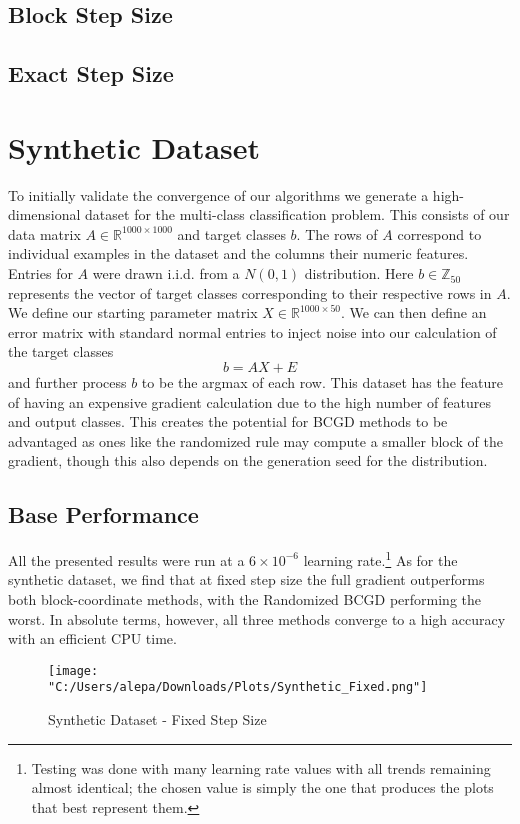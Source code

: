 \documentclass{article}
\begin{document}
\subsection{Block Step Size}
\subsection{Exact Step Size}

\section{Synthetic Dataset}
To initially validate the convergence of our algorithms we generate a high-dimensional dataset for the multi-class classification problem. This consists of our data matrix $A \in \mathbb{R}^{1000 \times 1000}$ and target classes $b$. The rows of $A$ correspond to individual examples in the dataset and the columns their numeric features. Entries for $A$ were drawn i.i.d. from a $N(0,1)$ distribution. Here $b \in \mathbb{Z}_{50}$ represents the vector of target classes corresponding to their respective rows in $A$. We define our starting parameter matrix $X \in \mathbb{R}^{1000 \times 50}$. We can then define an error matrix with standard normal entries to inject noise into our calculation of the target classes
$$b = AX + E$$
and further process $b$ to be the argmax of each row. This dataset has the feature of having an expensive gradient calculation due to the high number of features and output classes. This creates the potential for BCGD methods to be advantaged as ones like the randomized rule may compute a smaller block of the gradient, though this also depends on the generation seed for the distribution.

\subsection{Base Performance}
All the presented results were run at a $6 \times 10^{-6}$ learning rate.\footnote{Testing was done with many learning rate values with all trends remaining almost identical; the chosen value is simply the one that produces the plots that best represent them.}
As for the synthetic dataset, we find that at fixed step size the full gradient outperforms both block-coordinate methods, with the Randomized BCGD performing the worst. In absolute terms, however, all three methods converge to a high accuracy with an efficient CPU time.

\begin{figure}[H]
    \centering
    \texttt{[image: "C:/Users/alepa/Downloads/Plots/Synthetic\_Fixed.png"]}
    \caption{Synthetic Dataset - Fixed Step Size}
    \label{fig:synthetic_fixed}
\end{figure}
\end{document}
